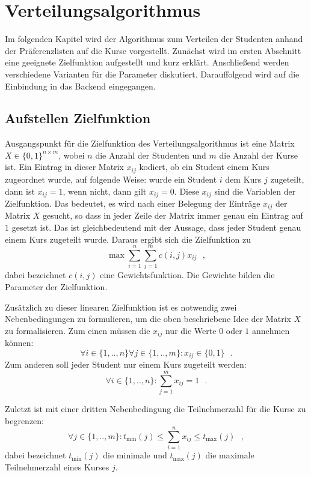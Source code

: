 \chapter{Verteilungsalgorithmus}
\label{chapter:algorithm}
    Im folgenden Kapitel wird der Algorithmus zum Verteilen der Studenten anhand der Präferenzlisten auf die Kurse vorgestellt.
    Zunächst wird im ersten Abschnitt eine geeignete Zielfunktion aufgestellt und kurz erklärt.
    Anschließend werden verschiedene Varianten für die Parameter diskutiert.
    Darauffolgend wird auf die Einbindung in das Backend eingegangen.
    
    \section{Aufstellen Zielfunktion}
        Ausgangspunkt für die Zielfunktion des Verteilungsalgorithmus ist eine Matrix $ X \in \{0,1\}^{n \times m}$, wobei $ n $ die Anzahl der Studenten und $ m $ die Anzahl der Kurse ist.
        Ein Eintrag in dieser Matrix $ x_{ij} $ kodiert, ob ein Student einem Kurs zugeordnet wurde, auf folgende Weise:
        wurde ein Student $ i $ dem Kurs $ j $ zugeteilt, dann ist $ x_{ij} = 1 $, wenn nicht, dann gilt $ x_{ij} = 0 $. 
        Diese $ x_{ij} $ sind die Variablen der Zielfunktion.
        Das bedeutet, es wird nach einer Belegung der Einträge $ x_{ij} $ der Matrix $ X $ gesucht, so dass in jeder Zeile der Matrix immer genau ein Eintrag auf $ 1 $ gesetzt ist.
        Das ist gleichbedeutend mit der Aussage, dass jeder Student genau einem Kurs zugeteilt wurde.
        Daraus ergibt sich die Zielfunktion zu
            $$ \max \sum_{i=1}^{n} \sum_{j=1}^{m} c(i,j)x_{ij}  ~~~,$$
        dabei bezeichnet $ c(i,j) $ eine Gewichtsfunktion.
        Die Gewichte bilden die Parameter der Zielfunktion.
        
        Zusätzlich zu dieser linearen Zielfunktion ist es notwendig zwei Nebenbedingungen zu formulieren, um die oben beschriebene Idee der Matrix $ X $ zu formalisieren.
        Zum einen müssen die $ x_{ij} $ nur die Werte $ 0 $ oder $ 1 $ annehmen können:
            $$\forall {i \in \{1,..,n\}} \forall {j \in \{1,..,m\}}:  x_{ij} \in \{0,1\} ~~~.$$
        Zum anderen soll jeder Student nur einem Kurs zugeteilt werden:
            $$ \forall {i \in \{1,..,n\}}: \sum_{j=1}^{m} x_{ij} = 1 ~~~.$$
        
        Zuletzt ist mit einer dritten Nebenbedingung die Teilnehmerzahl für die Kurse zu begrenzen:
             $$ \forall {j \in \{1,..,m\}}: t_{\min}(j) \leq \sum_{i=1}^{n} x_{ij} \leq t_{\max}(j) ~~~,$$
        dabei bezeichnet $ t_{\min}(j) $ die minimale und $ t_{\max}(j) $ die maximale Teilnehmerzahl eines Kurses $ j $.
        
